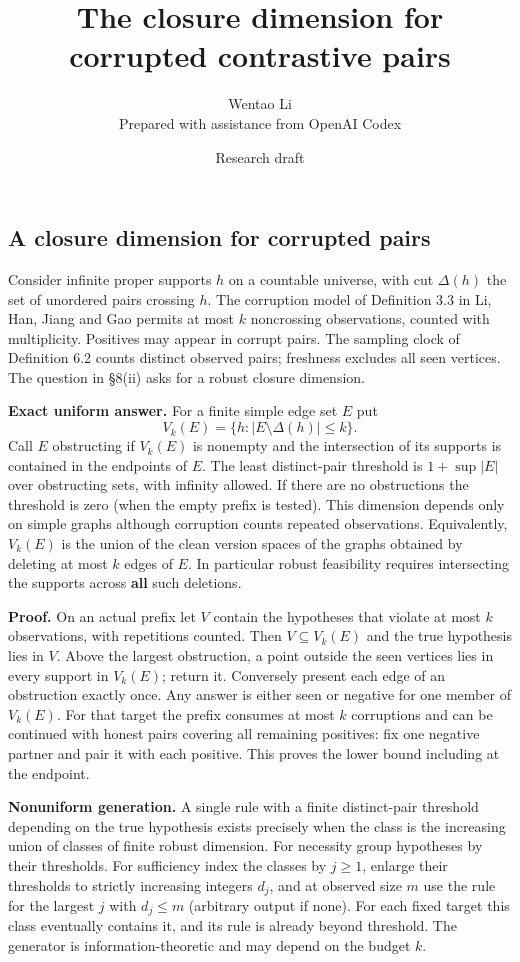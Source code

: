 \documentclass[11pt]{article}
\title{The closure dimension for corrupted contrastive pairs}
\author{Wentao Li\\{\small Prepared with assistance from OpenAI Codex}}
\date{Research draft}
\begin{document}
\maketitle
\subsection{A closure dimension for corrupted pairs}\label{a-closure-dimension-for-corrupted-pairs}

Consider infinite proper supports \(h\) on a countable universe, with cut \(\Delta(h)\) the set of unordered pairs crossing \(h\). The corruption model of Definition 3.3 in Li, Han, Jiang and Gao permits at most \(k\) noncrossing observations, counted with multiplicity. Positives may appear in corrupt pairs. The sampling clock of Definition 6.2 counts distinct observed pairs; freshness excludes all seen vertices. The question in §8(ii) asks for a robust closure dimension.

\textbf{Exact uniform answer.} For a finite simple edge set \(E\) put
\[V_k(E)=\{h: |E\setminus\Delta(h)|\le k\}.\]
Call \(E\) obstructing if \(V_k(E)\) is nonempty and the intersection of its supports is contained in the endpoints of \(E\). The least distinct-pair threshold is \(1+\sup |E|\) over obstructing sets, with infinity allowed. If there are no obstructions the threshold is zero (when the empty prefix is tested). This dimension depends only on simple graphs although corruption counts repeated observations. Equivalently, \(V_k(E)\) is the union of the clean version spaces of the graphs obtained by deleting at most \(k\) edges of \(E\). In particular robust feasibility requires intersecting the supports across \textbf{all} such deletions.

\textbf{Proof.} On an actual prefix let \(V\) contain the hypotheses that violate at most \(k\) observations, with repetitions counted. Then \(V\subseteq V_k(E)\) and the true hypothesis lies in \(V\). Above the largest obstruction, a point outside the seen vertices lies in every support in \(V_k(E)\); return it. Conversely present each edge of an obstruction exactly once. Any answer is either seen or negative for one member of \(V_k(E)\). For that target the prefix consumes at most \(k\) corruptions and can be continued with honest pairs covering all remaining positives: fix one negative partner and pair it with each positive. This proves the lower bound including at the endpoint.

\textbf{Nonuniform generation.} A single rule with a finite distinct-pair threshold depending on the true hypothesis exists precisely when the class is the increasing union of classes of finite robust dimension. For necessity group hypotheses by their thresholds. For sufficiency index the classes by \(j\ge1\), enlarge their thresholds to strictly increasing integers \(d_j\), and at observed size \(m\) use the rule for the largest \(j\) with \(d_j\le m\) (arbitrary output if none). For each fixed target this class eventually contains it, and its rule is already beyond threshold. The generator is information-theoretic and may depend on the budget \(k\).
\end{document}
